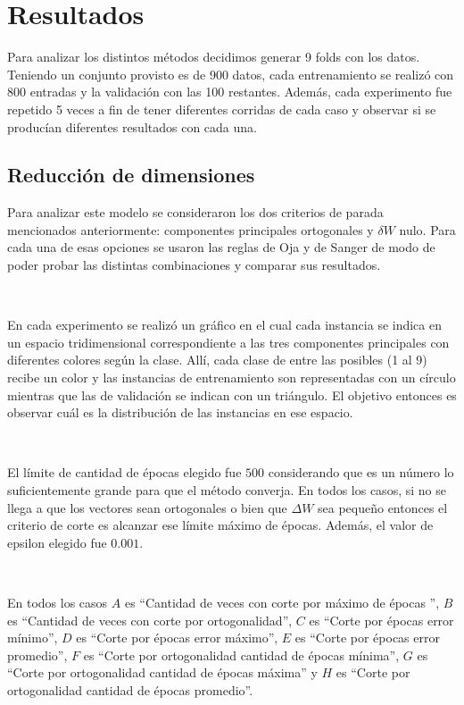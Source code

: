 \documentclass[informe.tex]{subfiles}
\begin{document}
  
  \section{Resultados}
    Para analizar los distintos métodos decidimos generar 9 folds con los datos. Teniendo un conjunto provisto es de 900 datos, cada entrenamiento se realiz\'o con 800 entradas y la validación con las 100 restantes. Además, cada experimento fue repetido 5 veces a fin de tener diferentes corridas de cada caso y observar si se produc\'ian diferentes resultados con cada una.
    
    \subsection{Reducción de dimensiones}
      Para analizar este modelo se consideraron los dos criterios de parada mencionados anteriormente: componentes principales ortogonales y $\delta W$ nulo. Para cada una de esas opciones se usaron las reglas de Oja y de Sanger de modo de poder probar las distintas combinaciones y comparar sus resultados. 
      
      ~
      
      En cada experimento se realizó un gráfico en el cual cada instancia se indica en un espacio tridimensional correspondiente a las tres componentes principales con diferentes colores según la clase. Allí, cada clase de entre las posibles (1 al 9) recibe un color y las instancias de entrenamiento son representadas con un círculo mientras que las de validación se indican con un triángulo. El objetivo entonces es observar cuál es la distribución de las instancias en ese espacio.
      
      ~
      
      El l\'imite de cantidad de \'epocas elegido fue $500$ considerando que es un n\'umero lo suficientemente grande para que el método converja. En todos los casos, si no se llega a que los vectores sean ortogonales o bien que $\Delta W$ sea pequeño entonces el criterio de corte es alcanzar ese límite máximo de épocas. Además, el valor de epsilon elegido fue $0.001$.
      
      ~
      
      En todos los casos $A$ es ``Cantidad de veces con corte por máximo de épocas '', $B$ es ``Cantidad de veces con corte por ortogonalidad'', $C$ es ``Corte por épocas error mínimo'', $D$ es ``Corte por épocas error máximo'', $E$ es ``Corte por épocas error promedio'', $F$ es ``Corte por ortogonalidad cantidad de épocas mínima'', $G$ es ``Corte por ortogonalidad cantidad de épocas máxima'' y $H$ es ``Corte por ortogonalidad cantidad de épocas promedio''.
      
\end{document}
